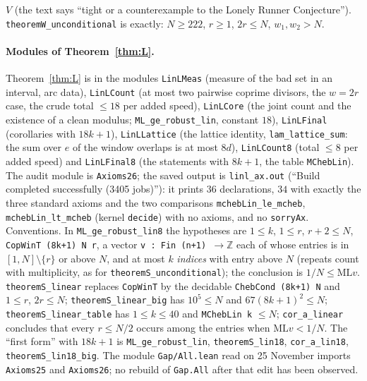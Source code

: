 \documentclass[11pt]{article}
\theoremstyle{definition}
\theoremstyle{remark}
\newcommand{\ML}{\mathrm{ML}}
\newcommand{\ZZ}{\mathbb{Z}}
\begin{document}
$V$ (the text says ``tight or a counterexample to the Lonely Runner Conjecture''). \texttt{theoremW\_unconditional} is exactly: $N\ge222$, $r\ge1$, $2r\le N$, $w_1,w_2>N$.

\paragraph{Modules of Theorem~\ref{thm:L}.}
Theorem~\ref{thm:L} is in the modules \texttt{LinLMeas} (measure of the bad set in an interval, arc data), \texttt{LinLCount} (at most two pairwise coprime divisors, the $w=2r$ case, the crude total $\le18$ per added speed), \texttt{LinLCore} (the joint count and the existence of a clean modulus; \texttt{ML\_ge\_robust\_lin}, constant $18$), \texttt{LinLFinal} (corollaries with $18k+1$), \texttt{LinLLattice} (the lattice identity, \texttt{lam\_lattice\_sum}: the sum over $e$ of the window overlaps is at most $8d$), \texttt{LinLCount8} (total $\le8$ per added speed) and \texttt{LinLFinal8} (the statements with $8k+1$, the table \texttt{MChebLin}). The audit module is \texttt{Axioms26}; the saved output is \texttt{linl\_ax.out} (``Build completed successfully (3405 jobs)''): it prints $36$ declarations, $34$ with exactly the three standard axioms and the two comparisons \texttt{mchebLin\_le\_mcheb}, \texttt{mchebLin\_lt\_mcheb} (kernel \texttt{decide}) with no axioms, and no \texttt{sorryAx}. Conventions. In \texttt{ML\_ge\_robust\_lin8} the hypotheses are $1\le k$, $1\le r$, $r+2\le N$, \texttt{CopWinT (8k+1) N r}, a vector \texttt{v : Fin (n+1) $\to\ZZ$} each of whose entries is in $[1,N]\setminus\{r\}$ or above $N$, and at most $k$ \emph{indices} with entry above $N$ (repeats count with multiplicity, as for \texttt{theoremS\_unconditional}); the conclusion is $1/N\le\ML v$. \texttt{theoremS\_linear} replaces \texttt{CopWinT} by the decidable \texttt{ChebCond (8k+1) N} and $1\le r$, $2r\le N$; \texttt{theoremS\_linear\_big} has $10^5\le N$ and $67(8k+1)^2\le N$; \texttt{theoremS\_linear\_table} has $1\le k\le40$ and \texttt{MChebLin k} $\le N$; \texttt{cor\_a\_linear} concludes that every $r\le N/2$ occurs among the entries when $\ML v<1/N$. The ``first form'' with $18k+1$ is \texttt{ML\_ge\_robust\_lin}, \texttt{theoremS\_lin18}, \texttt{cor\_a\_lin18}, \texttt{theoremS\_lin18\_big}. The module \texttt{Gap/All.lean} read on 25 November imports \texttt{Axioms25} and \texttt{Axioms26}; no rebuild of \texttt{Gap.All} after that edit has been observed.
\end{document}
